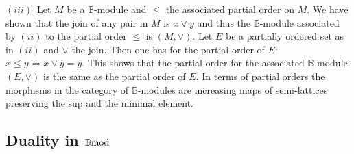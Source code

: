 \documentclass[12pt]{article}
\def\B{{\mathbb B}}
\def\bmod{{\rm \B mod}}
\begin{document}
	$(iii)$~Let $M$ be a $\B$-module and $\leq$ the associated partial order on $M$. We have shown that the join of any pair in $M$ is $x\vee y$ and thus the $\B$-module associated by $(ii)$ to the partial order $\leq$ is $(M,\vee)$. Let $E$ be a partially ordered set as in $(ii)$ and $\vee$ the join. Then one has for the partial order of $E$: 
	$
	x\leq y\iff x\vee y=y
	$.  
This shows that the partial order for the associated $\B$-module $(E,\vee)$ is the same as the partial order of $E$.\endproof
In terms of partial orders the morphisms in the category of $\B$-modules are increasing maps of semi-lattices preserving the sup and the minimal element.
 
 \subsection{Duality in $\bmod$}\label{sectbmodual}
\end{document}
